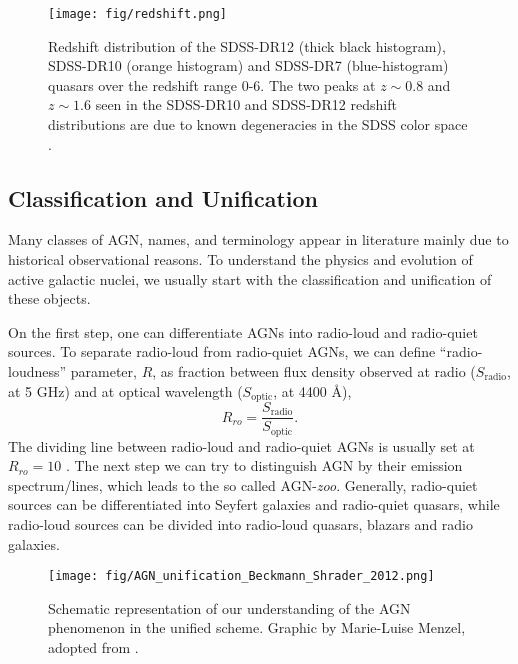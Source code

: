\begin{figure}[!ht]
\centering
\texttt{[image: fig/redshift.png]}
\caption[Redshift distribution of quasars from the SDSS]{Redshift distribution of the SDSS-DR12 (thick black histogram), SDSS-DR10 (orange histogram) and SDSS-DR7 (blue-histogram) quasars over the redshift range 0-6. The two peaks at $z \sim 0.8$ and $z \sim 1.6$ seen in the SDSS-DR10 and SDSS-DR12 redshift distributions are due to known degeneracies in the SDSS color space \citep{paris2017}.}
\label{fig:qso_z}
\end{figure}


\subsection{Classification and Unification}

Many classes of AGN, names, and terminology appear in literature mainly due to historical observational reasons. To understand the physics and evolution of active galactic nuclei, we usually start with the classification and unification of these objects. 

On the first step, one can differentiate AGNs into radio-loud and radio-quiet sources. To separate radio-loud from radio-quiet AGNs, we can define ``radio-loudness'' parameter, $R$, as fraction between flux density observed at radio 
($S_{\text{radio}}$, at 5 GHz) and at optical wavelength ($S_{\text{optic}}$, at 4400 \AA),
\begin{equation}
R_{ro}  = \frac{S_{\text{radio}}}{S_{\text{optic}}}.
\label{eq:loudness}
\end{equation} 
The dividing line between radio-loud and radio-quiet AGNs is usually set at $R_{ro} = 10$ \citep{kellermann1989}. The next step we can try to distinguish AGN by their emission spectrum/lines, which leads to the so called AGN-\textit{zoo}. Generally, radio-quiet sources can be differentiated into Seyfert galaxies and radio-quiet quasars, while radio-loud sources can be divided into radio-loud quasars, blazars and radio galaxies. 

\begin{figure}[!ht]
\centering
\texttt{[image: fig/AGN\_unification\_Beckmann\_Shrader\_2012.png]}
\caption[Schematic representation of our understanding of the AGN phenomenon in the unified scheme]{Schematic representation of our understanding of the AGN phenomenon in the unified scheme. Graphic by Marie-Luise Menzel, adopted from \cite{beckmann2012}.}
\label{fig:agn_unif1}
\end{figure}

